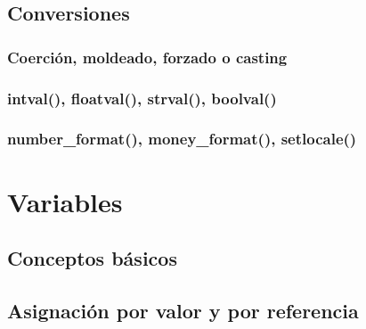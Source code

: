 \documentclass[a4paper,11pt,spanish]{sphinxmanual}
\begin{document}
\subsubsection{}
\label{\detokenize{php:is-numeric}}

\subsubsection{}
\label{\detokenize{php:ctype}}

\subsection{Conversiones}
\label{\detokenize{php:conversiones}}

\subsubsection{Coerción, moldeado, forzado o casting}
\label{\detokenize{php:coercion-moldeado-forzado-o-casting}}

\subsubsection{intval(), floatval(), strval(), boolval()}
\label{\detokenize{php:intval-floatval-strval-boolval}}

\subsubsection{number\_format(), money\_format(), setlocale()}
\label{\detokenize{php:number-format-money-format-setlocale}}

\section{Variables}
\label{\detokenize{php:variables}}

\subsection{Conceptos básicos}
\label{\detokenize{php:conceptos-basicos}}

\subsection{Asignación por valor y por referencia}
\label{\detokenize{php:asignacion-por-valor-y-por-referencia}}
\end{document}
